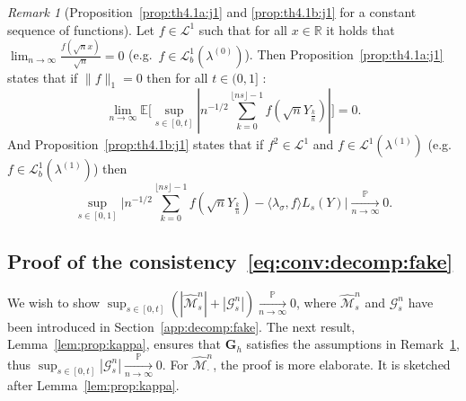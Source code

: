 \documentclass[12pt]{article}
\numberwithin{equation}{section}
\theoremstyle{definition}
\theoremstyle{remark}
\newtheorem{remark}{Remark}
\newcommand{\convp}[1][]{\xrightarrow[#1]{\PP}}
\newcommand{\RR}{\mathbb{R}}
\newcommand{\PP}{\mathbb{P}}
\newcommand{\EE}{\mathbb{E}}
\newcommand{\cG}{\mathcal{G}}
\newcommand{\Lone}{\mathcal{L}^1}
\newcommand{\Loneg}[1]{\mathcal{L}^1(\lambda^{(#1)})}
\newcommand{\Lgb}[1]{\mathcal{L}^{1}_{b}(\lambda^{(#1)})}
\newcommand{\bfG}[1]{\mathbf{G}_{#1}}
\begin{document}
\begin{remark}[Proposition~\ref{prop:th4.1a:j1} and \ref{prop:th4.1b:j1} for a constant sequence of functions] \label{rem:prop:th4:1:j1}
Let $f \in \Lone$ such that for all $x\in \RR$ it holds that $\lim_{n\to\infty}\frac{f(\sqrt{n}x)}{\sqrt{n}}=0$ (e.g.~$f\in \Lgb{0}$).
Then Proposition~\ref{prop:th4.1a:j1} states that if $\|f\|_1=0$ then for all $t\in (0,1]$ :
\begin{equation}
	\lim_{n\to\infty} \EE\Big[\sup_{s\in [0,t]}|n^{-1/2}  \sum_{k=0}^{\lfloor n s \rfloor-1} f(\sqrt{n} Y_{\frac{k}n}) |\Big]=0.
\end{equation}
And Proposition~\ref{prop:th4.1b:j1} states that if 
$f^2\in \Lone$ and $f\in \Loneg{1}$ (e.g.~$f\in\Lgb{1}$)
then 
\begin{equation}
	\sup_{s\in [0,1]} \Big| n^{-1/2}  \sum_{k=0}^{\lfloor n s \rfloor-1} f(\sqrt{n} Y_{\frac{k}n}) - \langle \lambda_\sigma , f \rangle L_s(Y)\Big|\convp[n\to\infty] 0.
\end{equation}
\end{remark}





\subsection{Proof of the consistency~\eqref{eq:conv:decomp:fake}} \label{sec:proof:details}

We wish to show $\sup_{s\in [0,t]} (|\widehat{\mathcal{M}}^n_s| + |\cG^n_s|) \convp[n\to\infty] 0$, 
where $\widehat{\mathcal{M}}^n_s$ and $\cG^n_s$ have been introduced in Section~\ref{app:decomp:fake}.
%
The next result, Lemma~\ref{lem:prop:kappa}, ensures that $\bfG{h}$ satisfies the assumptions in Remark~\ref{rem:prop:th4:1:j1}, thus $\sup_{s\in [0,t]} |\cG^n_s|\convp[n\to\infty] 0$.
%
For $\widehat{\mathcal{M}}^n_\cdot$, the proof is more elaborate. It is sketched after Lemma~\ref{lem:prop:kappa}.
\end{document}
